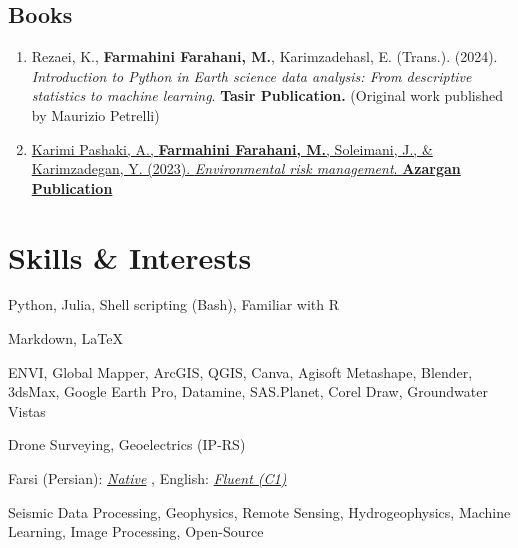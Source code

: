 \documentclass[letterpaper,11pt]{article}
\begin{document}
\begin{justify}
	\subsection*{Books}
	\begin{enumerate}[label=\arabic*.,left=0pt,topsep=7.5pt,partopsep=0pt,itemsep=3.5pt,parsep=0pt]
		\item Rezaei, K., \textbf{Farmahini Farahani, M.}, Karimzadehasl, E. (Trans.). (2024). \textit{Introduction to Python in Earth science data analysis: From descriptive statistics to machine learning}. \textbf{Tasir Publication.} (Original work published by Maurizio Petrelli)
		\item \href{https://www.researchgate.net/publication/374919527_Environmental_Risk_Management}{Karimi Pashaki, A., \textbf{Farmahini Farahani, M.}, Soleimani, J., \& Karimzadegan, Y. (2023). \textit{Environmental risk management}. \textbf{Azargan Publication}} 
	\end{enumerate}
\end{justify}

\section{Skills \& Interests}
\begin{description}[itemsep=0pt]
	\item[Programming Language:] Python, Julia, Shell scripting (Bash), Familiar with R
	\item[Markup Language:] Markdown, \LaTeX
	\item[Software:] ENVI, Global Mapper, ArcGIS, QGIS, Canva, Agisoft Metashape, Blender, 3dsMax, Google Earth Pro, Datamine, SAS.Planet, Corel Draw, Groundwater Vistas
	\item[Fieldwork Skills:] Drone Surveying, Geoelectrics (IP-RS)
	\item[Language:] Farsi (Persian): \textit{\underline{Native}} , English: \textit{\underline{Fluent (C1)}}
	\item[Research Interests:] Seismic Data Processing, Geophysics, Remote Sensing, Hydrogeophysics, Machine Learning, Image Processing, Open-Source
\end{description}
\end{document}
